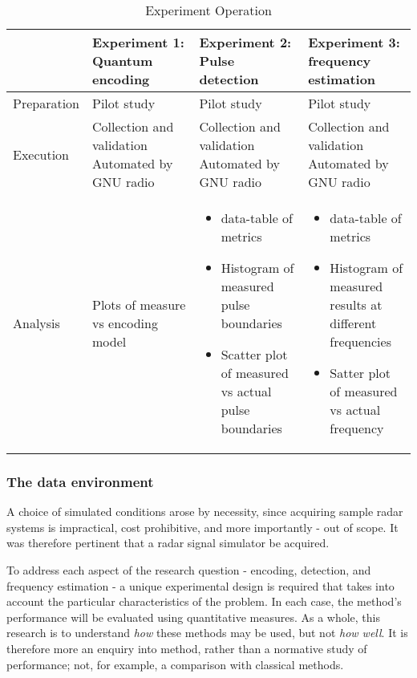\begin{table}[ht]
\caption{Experiment Operation}
\label{tab:exp_operation}
\begin{tabular}{p{0.16\linewidth}|p{0.28\linewidth}p{0.28\linewidth}|p{0.28\linewidth}}
\hline
& Experiment 1: Quantum encoding & Experiment 2: Pulse detection & Experiment 3: frequency estimation \\
\hline
Preparation & Pilot study & Pilot study & Pilot study \\
Execution & Collection and validation Automated by GNU radio & Collection and validation Automated by GNU radio & Collection and validation Automated by GNU radio \\
Analysis & Plots of measure vs encoding model &
\begin{itemize}
    \item data-table of metrics
    \item Histogram of measured pulse boundaries
    \item Scatter plot of measured vs actual pulse boundaries
\end{itemize}
&
\begin{itemize}
    \item data-table of metrics
    \item Histogram of measured results at different frequencies
    \item Satter plot of measured vs actual frequency
\end{itemize}\\
\hline
\end{tabular}
\end{table}

\subsubsection{The data environment}

A choice of simulated conditions arose by necessity, since acquiring sample radar systems is impractical, cost prohibitive, and more importantly - out of scope.
It was therefore pertinent that a radar signal simulator be acquired.

To address each aspect of the research question - encoding, detection, and frequency estimation - a unique experimental design is required that takes into account the particular characteristics of the problem.
In each case, the method's performance will be evaluated using quantitative measures.
As a whole, this research is to understand \textit{how} these methods may be used, but not \textit{how well}.
It is therefore more an enquiry into method, rather than a normative study of performance; not, for example, a comparison with classical methods.

